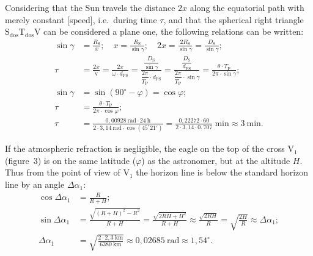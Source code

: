 \begin{description}
  Considering that the Sun travels the distance $2x$ along the equatorial
  path with merely constant [speed], i.e.\ during time $\tau$, and that the
  spherical right triangle $\mathrm{S_{dos}}\mathrm{T_{dos}}\mathrm{V}$ can
  be considered a plane one, the following relations can be written:
  \begin{align*}
  \sin\gamma &= \frac{R_{\mathrm{S}}}{x};\quad
    x = \frac{R_{\mathrm{S}}}{\sin\gamma};\quad
    2x = \frac{2R_{\mathrm{S}}}{\sin\gamma}
       = \frac{D_{\mathrm{S}}}{\sin\gamma};\\
  \tau &= \frac{2x}{\mathrm{v}}
    = \frac{2x}{\omega\cdot d_{\mathrm{PS}}}
    = \frac{\dfrac{D_{\mathrm{S}}}{\sin\gamma}}
           {\dfrac{2\pi}{T_{\mathrm{P}}}\cdot d_{\mathrm{PS}}}
    = \frac{\dfrac{D_{\mathrm{S}}}{d_{\mathrm{PS}}}}
           {\dfrac{2\pi}{T_{\mathrm{P}}}\cdot\sin\gamma}
    = \frac{\theta\cdot T_{\mathrm{P}}}{2\pi\cdot\sin\gamma};\\
  \sin\gamma &= \sin(90^\circ - \varphi) = \cos\varphi;\\
  \tau &= \frac{\theta\cdot T_{\mathrm{P}}}{2\pi\cdot\cos\varphi};\\
  \tau &= \frac{0{,}00928\ \mathrm{rad}\cdot 24\ \mathrm{h}}
              {2\cdot 3{,}14\ \mathrm{rad}\cdot\cos(45^\circ 21')}
    = \frac{0{,}22272\cdot 60}{2\cdot 3{,}14\cdot 0{,}707}\ \mathrm{min}
    \approx 3\ \mathrm{min}.
  \end{align*}

\item[A.2)] If the atmospheric refraction is negligible, the eagle on the
  top of the cross $\mathrm{V}_1$ (figure~3) is on the same latitude
  ($\varphi$) as the astronomer, but at the altitude $H$. Thus from the point
  of view of $\mathrm{V}_1$ the horizon line is below the standard horizon
  line by an angle $\Delta\alpha_1$:
  \begin{align*}
  \cos\Delta\alpha_1 &= \frac{R}{R+H};\\
  \sin\Delta\alpha_1 &= \frac{\sqrt{(R+H)^2 - R^2}}{R+H}
    = \frac{\sqrt{2RH + H^2}}{R+H}
    \approx \frac{\sqrt{2RH}}{R}
    = \sqrt{\frac{2H}{R}} \approx \Delta\alpha_1;\\
  \Delta\alpha_1 &= \sqrt{\frac{2\cdot 2{,}3\ \mathrm{km}}{6380\ \mathrm{km}}}
    \approx 0{,}02685\ \mathrm{rad} \approx 1{,}54^\circ.
  \end{align*}


\end{description}
